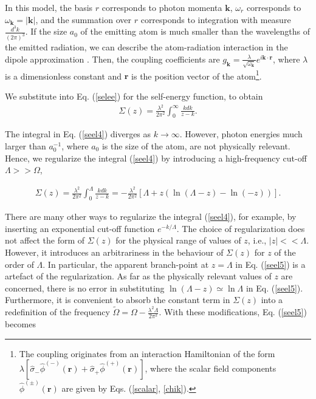 \documentclass[12pt]{article}
\numberwithin{equation}{section}
\begin{document}
In this model, the basis $r$ corresponds to photon momenta ${\pmb k}$, $\omega_r$ corresponds to $\omega_{\pmb k } = |{\pmb k}|$, and the summation over $r$ corresponds to integration with   measure $\frac{d^3k}{(2\pi)^3}$. If  the size $a_0$ of the emitting atom is much smaller than the wavelengths of the emitted radiation, we can describe the atom-radiation interaction in the dipole approximation  \cite{QO}. Then, the coupling coefficients are  $g_{\pmb k} = \frac{\lambda }{\sqrt{\omega_{\pmb k}}}e^{i {\pmb k}\cdot{\pmb r}}$, where $\lambda $ is a dimensionless constant and ${\pmb r}$ is the position vector of the atom\footnote{The coupling originates from an interaction Hamiltonian of the form $\lambda[\hat{\sigma}_-\hat{\phi}^{(-)}({\pmb r}) + \hat{\sigma}_+\hat{\phi}^{(+)}({\pmb r})] $, where the scalar field components $\hat{\phi}^{(\pm)}  ({\pmb r}) $ are given by Eqs. (\ref{scalar}, \ref{chik}).}.

 We substitute into Eq. (\ref{selee}) for the self-energy function, to obtain
\begin{eqnarray}
\Sigma(z) = \frac{\lambda^2}{2 \pi^2} \int_0^{\infty} \frac{k dk}{z - k}. \label{seel4}
\end{eqnarray}

The integral in Eq. (\ref{seel4}) diverges as $k \rightarrow \infty$.  However, photon energies much larger than $a_0^{-1}$, where $a_0$ is the size of the atom, are not physically relevant. Hence, we regularize the integral (\ref{seel4}) by introducing a high-frequency cut-off $\Lambda >> \Omega$,

  \begin{eqnarray}
   \Sigma (z) = \frac{\lambda^2}{2 \pi^2}  \int_0^{\Lambda} \frac{k  dk}{z-k} = - \frac{\lambda^2}{2 \pi^2} \left[ \Lambda + z (\ln(\Lambda - z) - \ln (-z)) \right]. \label{seel5}
  \end{eqnarray}

  There are many other ways to regularize the integral (\ref{seel4}), for example, by inserting an exponential cut-off function  $e^{-k/\Lambda}$. The choice of regularization does not affect the form of $\Sigma(z)$ for the physical range of values of $z$, i.e., $|z|<< \Lambda$. However, it introduces an arbitrariness in the behaviour of $\Sigma(z)$ for $z$ of the order of $\Lambda$. In particular,   the apparent branch-point at $z = \Lambda$ in Eq. (\ref{seel5}) is a artefact of the regularization. As far as the physically relevant values of $z$ are  concerned,  there is no error in substituting
   $\ln(\Lambda - z) \simeq \ln \Lambda$ in Eq. (\ref{seel5}). Furthermore, it is convenient to absorb the constant term in $\Sigma(z)$ into a redefinition of the frequency  $\tilde{\Omega} = \Omega -  \frac{\lambda^2\Lambda}{2 \pi^2}$.
   With these modifications, Eq. (\ref{seel5}) becomes
\end{document}
